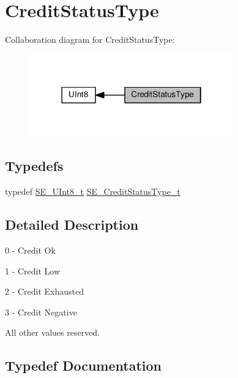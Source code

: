 \hypertarget{group__CreditStatusType}{}\section{Credit\+Status\+Type}
\label{group__CreditStatusType}
Collaboration diagram for Credit\+Status\+Type\+:\nopagebreak
\begin{figure}[H]
\begin{center}
\leavevmode
\includegraphics[width=250pt]{group__CreditStatusType}
\end{center}
\end{figure}
\subsection*{Typedefs}
\begin{DoxyCompactItemize}
\item 
typedef \hyperlink{group__UInt8_gaf7c365a1acfe204e3a67c16ed44572f5}{S\+E\+\_\+\+U\+Int8\+\_\+t} \hyperlink{group__CreditStatusType_gadc768115dd9712a2356f01ac1aab6700}{S\+E\+\_\+\+Credit\+Status\+Type\+\_\+t}
\end{DoxyCompactItemize}


\subsection{Detailed Description}
0 -\/ Credit Ok

1 -\/ Credit Low

2 -\/ Credit Exhausted

3 -\/ Credit Negative

All other values reserved. 

\subsection{Typedef Documentation}
\mbox{\label{group__CreditStatusType_gadc768115dd9712a2356f01ac1aab6700}} 
